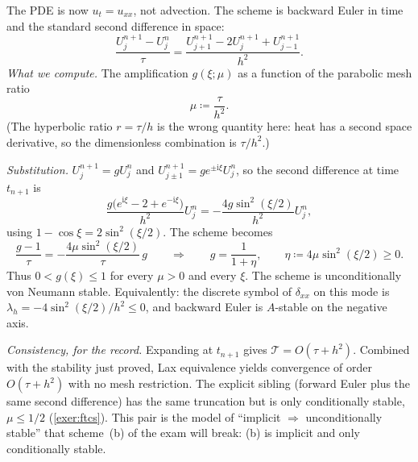 \documentclass[11pt,a4paper]{article}
\begin{document}
\begin{example}
\label{ex:be-heat}
The PDE is now \(u_t=u_{xx}\), not advection. The scheme is backward Euler in time and the standard second difference in space:
\[
\frac{U_j^{n+1}-U_j^n}{\tau}
=
\frac{U_{j+1}^{n+1}-2U_j^{n+1}+U_{j-1}^{n+1}}{h^2}.
\]
\emph{What we compute.} The amplification \(g(\xi;\mu)\) as a function of the parabolic mesh ratio
\[
\mu
\coloneqq
\frac{\tau}{h^2}.
\]
(The hyperbolic ratio \(r=\tau/h\) is the wrong quantity here: heat has a second space derivative, so the dimensionless combination is \(\tau/h^2\).)

\emph{Substitution.} \(U_j^{n+1}=g U_j^n\) and \(U_{j\pm 1}^{n+1}=g e^{\pm\mathrm i\xi}U_j^n\), so the second difference at time \(t_{n+1}\) is
\[
\frac{g\bigl(e^{\mathrm i\xi}-2+e^{-\mathrm i\xi}\bigr)}{h^2}U_j^n
=
-\frac{4g\sin^2(\xi/2)}{h^2}U_j^n,
\]
using \(1-\cos\xi=2\sin^2(\xi/2)\). The scheme becomes
\[
\frac{g-1}{\tau}
=
-\frac{4\mu\sin^2(\xi/2)}{\tau}\,g
\qquad\Longrightarrow\qquad
g
=
\frac{1}{1+\eta},
\qquad
\eta
\coloneqq
4\mu\sin^2(\xi/2)\ge 0.
\]
Thus \(0<g(\xi)\le 1\) for every \(\mu>0\) and every \(\xi\). The scheme is unconditionally von Neumann stable. Equivalently: the discrete symbol of \(\delta_{xx}\) on this mode is \(\lambda_h=-4\sin^2(\xi/2)/h^2\le 0\), and backward Euler is \(A\)-stable on the negative axis.

\emph{Consistency, for the record.} Expanding at \(t_{n+1}\) gives \(\mathcal T=O(\tau+h^2)\). Combined with the stability just proved, Lax equivalence yields convergence of order \(O(\tau+h^2)\) with no mesh restriction. The explicit sibling (forward Euler plus the same second difference) has the same truncation but is only conditionally stable, \(\mu\le 1/2\) (\cref{exer:ftcs}). This pair is the model of ``implicit \(\Rightarrow\) unconditionally stable'' that scheme~(b) of the exam will break: (b) is implicit and only conditionally stable.
\end{example}
\end{document}
